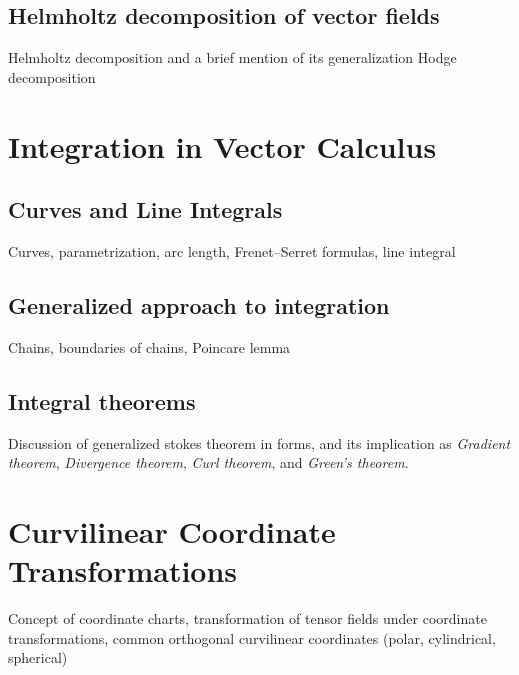 \section{Helmholtz decomposition of vector fields}
Helmholtz decomposition and a brief mention of its generalization Hodge decomposition

\chapter{Integration in Vector Calculus}
\section{Curves and Line Integrals}
Curves, parametrization, arc length, Frenet–Serret formulas, line integral
\section{Generalized approach to integration}
Chains, boundaries of chains, Poincare lemma
\section{Integral theorems}
Discussion of generalized stokes theorem in forms, and its implication as \emph{Gradient theorem}, \emph{Divergence theorem}, \emph{Curl theorem}, and \emph{Green's theorem}.

\chapter{Curvilinear Coordinate Transformations}
Concept of coordinate charts, transformation of tensor fields under coordinate transformations, common orthogonal curvilinear coordinates (polar, cylindrical, spherical)
